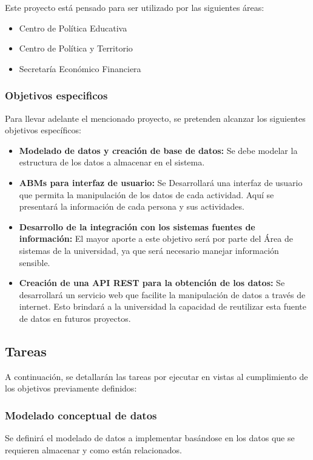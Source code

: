 \documentclass{article}
\begin{document}
Este proyecto está pensado para ser utilizado por las siguientes áreas:
\begin{itemize}
    \item Centro de Política Educativa
    \item Centro de Política y Territorio
    \item Secretaría Económico Financiera
\end{itemize}


\subsubsection{Objetivos especificos}%
\label{ssub:objetivos_especificos}

Para llevar adelante el mencionado proyecto, se pretenden alcanzar los siguientes objetivos específicos:

\begin{itemize}
    \item \textbf{Modelado de datos y creación de base de datos:} Se debe modelar la estructura de los datos a almacenar en el sistema.
    \item \textbf{ABMs para interfaz de usuario:} Se Desarrollará una interfaz de usuario que permita la manipulación de los datos de cada actividad\@. Aquí se presentará la información de cada persona y sus actividades.
    \item \textbf{Desarrollo de la integración con los sistemas fuentes de información:} El mayor aporte a este objetivo será por parte del Área de sistemas de la universidad, ya que será necesario manejar información sensible.
    \item \textbf{Creación de una API REST para la obtención de los datos:} Se desarrollará un servicio web que facilite la manipulación de datos a través de internet. Esto brindará a la universidad la capacidad de reutilizar esta fuente de datos en futuros proyectos.
\end{itemize}

\subsection{Tareas}%
\label{sub:tareas}
A continuación, se detallarán las tareas por ejecutar en vistas al cumplimiento de los objetivos previamente definidos:

\subsubsection{Modelado conceptual de datos}%
\label{ssub:modelado_conceptual_de_datos}
Se definirá el modelado de datos a implementar basándose en los datos que se requieren almacenar y como están relacionados.
\end{document}
